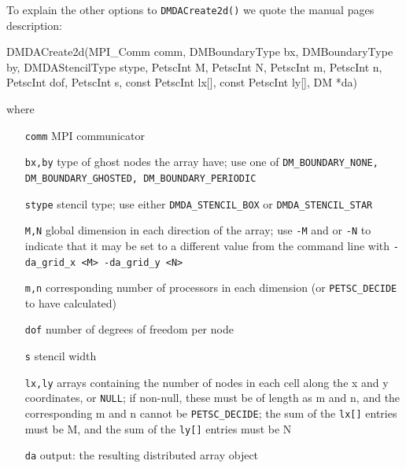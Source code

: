 To explain the other options to \texttt{DMDACreate2d()} we quote the \PETSc manual pages description:

\begin{code}
DMDACreate2d(MPI_Comm comm, DMBoundaryType bx, DMBoundaryType by,
  DMDAStencilType stype, PetscInt M, PetscInt N, PetscInt m, PetscInt n,
  PetscInt dof, PetscInt s, const PetscInt lx[], const PetscInt ly[],
  DM *da)
\end{code}
where
\small
\begin{itemize}[align=left]
\item[\texttt{comm}]   MPI communicator \\
\item[\texttt{bx,by}]  type of ghost nodes the array have; use one of \texttt{DM\_BOUNDARY\_NONE, DM\_BOUNDARY\_GHOSTED, DM\_BOUNDARY\_PERIODIC} \\
\item[\texttt{stype}] stencil type; use either \texttt{DMDA\_STENCIL\_BOX} or \texttt{DMDA\_STENCIL\_STAR} \\
\item[\texttt{M,N}]	   global dimension in each direction of the array; use \texttt{-M} and or \texttt{-N} to indicate that it may be set to a different value from the command line with \texttt{-da\_grid\_x <M> -da\_grid\_y <N>} \\
\item[\texttt{m,n}]   corresponding number of processors in each dimension (or \texttt{PETSC\_DECIDE} to have calculated) \\
\item[\texttt{dof}]     number of degrees of freedom per node \\
\item[\texttt{s}]       stencil width \\
\item[\texttt{lx,ly}]  arrays containing the number of nodes in each cell along the x and y coordinates, or \texttt{NULL}; if non-null, these must be of length as m and n, and the corresponding m and n cannot be \texttt{PETSC\_DECIDE}; the sum of the \texttt{lx[]} entries must be M, and the sum of the \texttt{ly[]} entries must be N \\
\item[\texttt{da}]      output: the resulting distributed array object 
\end{itemize}
\normalsize

